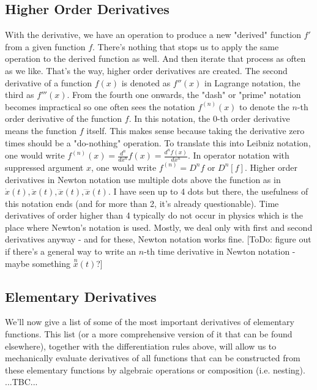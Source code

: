 \subsection{Higher Order Derivatives}
With the derivative, we have an operation to produce a new "derived" function $f'$ from a given function $f$. There's nothing that stops us to apply the same operation to the derived function as well. And then iterate that process as often as we like. That's the way, higher order derivatives are created. The second derivative of a function $f(x)$ is denoted as $f''(x)$ in Lagrange notation, the third as $f'''(x)$. From the fourth one onwards, the "dash" or "prime" notation becomes impractical so one often sees the notation $f^{(n)}(x)$ to denote the $n$-th order derivative of the function $f$. In this notation, the $0$-th order derivative means the function $f$ itself. This makes sense because taking the derivative zero times should be a "do-nothing" operation. To translate this into Leibniz notation, one would write $f^{(n)}(x) = \frac{d^n}{d x^n} f(x) = \frac{d^n f(x)}{d x^n}$. In operator notation with suppressed argument $x$, one would write $f^{(n)} = D^n f$ or $D^n[f]$. Higher order derivatives in Newton notation use multiple dots above the function as in $\dot{x}(t), \ddot{x}(t), \dddot{x}(t), \ddddot{x}(t)$. I have seen up to 4 dots but there, the usefulness of this notation ends (and for more than 2, it's already questionable). Time derivatives of order higher than 4 typically do not occur in physics which is the place where Newton's notation is used. Mostly, we deal only with first and second derivatives anyway - and for these, Newton notation works fine. [ToDo: figure out if there's a general way to write an $n$-th time derivative in Newton notation - maybe something $\overset{n}{x}(t)$?]


\subsection{Elementary Derivatives}
We'll now give a list of some of the most important derivatives of elementary functions. This list (or a more comprehensive version of it that can be found elsewhere), together with the differentiation rules above, will allow us to mechanically evaluate derivatives of all functions that can be constructed from these elementary functions by algebraic operations or composition (i.e. nesting). ...TBC...

